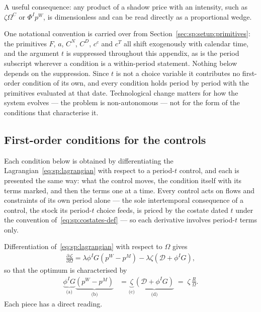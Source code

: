 A useful consequence: any product of a shadow price with an intensity, such as $\zeta\Omega^C$ or $\Phi^Ip^W$, is dimensionless and can be read directly as a proportional wedge.

One notational convention is carried over from Section~\ref{sec:sp:setup:primitives}: the primitives $F$, $a$, $C^N$, $C^D$, $c^c$ and $c^T$ all shift exogenously with calendar time, and the argument $t$ is suppressed throughout this appendix, as is the period subscript wherever a condition is a within-period statement. Nothing below depends on the suppression. Since $t$ is not a choice variable it contributes no first-order condition of its own, and every condition holds period by period with the primitives evaluated at that date. Technological change matters for how the system evolves --- the problem is non-autonomous --- not for the form of the conditions that characterise it.

\subsection{First-order conditions for the controls}\label{sec:app:sp:foc}

Each condition below is obtained by differentiating the Lagrangian~\eqref{eq:sp:lagrangian} with respect to a period-$t$ control, and each is presented the same way: what the control moves, the condition itself with its terms marked, and then the terms one at a time. Every control acts on flows and constraints of its own period alone --- the sole intertemporal consequence of a control, the stock its period-$t$ choice feeds, is priced by the costate dated $t$ under the convention of~\eqref{eq:sp:costates-def} --- so each derivative involves period-$t$ terms only.

Differentiation of~\eqref{eq:sp:lagrangian} with respect to $\Omega$ gives
\begin{align*}
    \frac{\partial \mathcal{L}}{\partial \Omega} = \lambda \phi^IG\left(p^W-p^M\right) - \lambda \zeta \left(\mathcal{D}+\phi^IG\right),
\end{align*}
so that the optimum is characterised by
\begin{align}
    \underbrace{\phi^IG}_{\text{(a)}}\underbrace{\left(p^W-p^M\right)}_{\text{(b)}}
    &= \underbrace{\zeta}_{\text{(c)}}\underbrace{\left(\mathcal D+\phi^IG\right)}_{\text{(d)}}
    \;=\;\zeta\,\frac{R}{\Omega}.
\label{eq:sp:foc:Omega}
\end{align}
Each piece has a direct reading.

